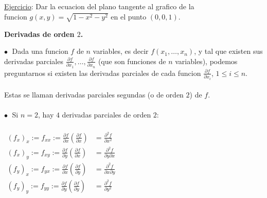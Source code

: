 \documentclass{article}
\theoremstyle{definition}
\theoremstyle{definition}
\theoremstyle{remark}
\newcommand\bl{$\bullet\;$}
\begin{document}
  \begin{figure}[h]
\centering
\def\svgwidth{0.65\textwidth}
\makebox[\textwidth]{
}
\end{figure} \;  
\\\\\\\\\\\\\\\\\\
\underline{Ejercicio}:
  Dar la ecuacion del plano tangente al grafico de la\\ funcion $g(x,y)=\sqrt{1-x^2-y^2}$ en el punto $(0,0,1).$
  \begin{figure}[h]
\centering
\def\svgwidth{0.65\textwidth}
\makebox[\textwidth]{
}
\end{figure} 
\begin{center}
\textbf{Derivadas de orden $2$.}
\end{center}
\textcolor{rojop2}{\bl} Dada una funcion $f$ de $n$ variables, es decir $f(x_1,\dots,x_n)$, y tal que existen sus derivadas parciales $\frac{\partial f}{\partial x_1},\dots,\frac{\partial f}{\partial x_n}$ (que son funciones de $n$ variables), podemos preguntarnos si existen las derivadas parciales de cada funcion $\frac{\partial f}{\partial x_i}$, $1 \leq i \leq n$. \\\\ Estas se llaman derivadas parciales segundas (o de orden $2$) de $f$. \\\\
\textcolor{verdep2}{\bl} Si $n=2$, hay $4$ derivadas parciales de orden $2$: \\\\ $\begin{aligned} 
  (f_x)_x := f_{xx} := \frac{\partial f}{\partial x} \left(\frac{\partial f}{\partial x}\right) & = \frac{\partial^2 f}{\partial x^2} \\
  (f_x)_y := f_{xy} := \frac{\partial f}{\partial y} \left(\frac{\partial f}{\partial x}\right) & = \frac{\partial^2 f}{\partial y \partial x} \\
  (f_y)_x := f_{yx} := \frac{\partial f}{\partial x}\left(\frac{\partial f}{\partial y }\right) & =\frac{\partial^2 f}{\partial x \partial y} \\
  (f_y)_y := f_{yy} := \frac{\partial f}{\partial y}\left(\frac{\partial f}{\partial y }\right) & =\frac{\partial^2 f}{\partial y^2} \\
\end{aligned}$ \\\\
\end{document}
